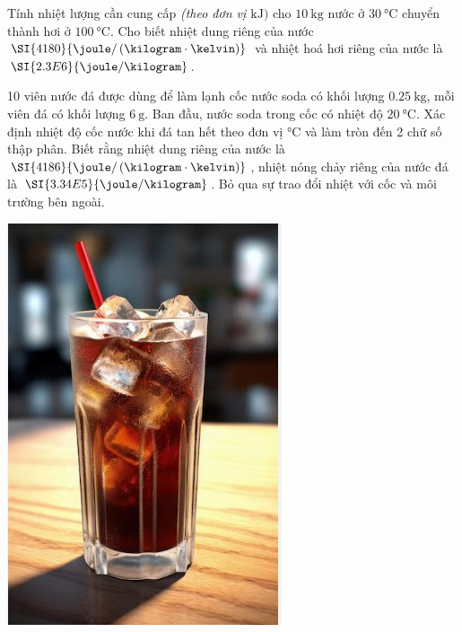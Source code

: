 \begin{enumerate}[label=\bfseries Câu \arabic*:, leftmargin=1.7cm]
\item Tính nhiệt lượng cần cung cấp \textit{(theo đơn vị $\si{\kilo\joule})$} cho $\SI{10}{\kilogram}$ nước ở $\SI{30}{\celsius}$ chuyển thành hơi ở $\SI{100}{\celsius}$. Cho biết nhiệt dung riêng của nước $\SI{4180}{\joule/\left(\kilogram\cdot\kelvin\right)}$ và nhiệt hoá hơi riêng của nước là $\SI{2.3E6}{\joule/\kilogram}$.
\\
\begin{minipage}[l]{0.7\textwidth}
	\item 10 viên nước đá được dùng để làm lạnh cốc nước soda có khối lượng $\SI{0.25}{\kilogram}$, mỗi viên đá có khối lượng $\SI{6}{\gram}$. Ban đầu, nước soda trong cốc có nhiệt độ $\SI{20}{\celsius}$. Xác định nhiệt độ cốc nước khi đá tan hết theo đơn vị $\si{\celsius}$ và làm tròn đến 2 chữ số thập phân. Biết rằng nhiệt dung riêng của nước là $\SI{4186}{\joule/\left(\kilogram\cdot\kelvin\right)}$, nhiệt nóng chảy riêng của nước đá là $\SI{3.34E5}{\joule/\kilogram}$. Bỏ qua sự trao đổi nhiệt với cốc và môi trường bên ngoài.
\end{minipage}\hfill
\begin{minipage}[l]{0.3\textwidth}
\begin{center}
	\includegraphics[width=0.3\linewidth]{../figs/VN12-Y24-PH-SYL-008-1}
\end{center}
\end{minipage}


\end{enumerate}
